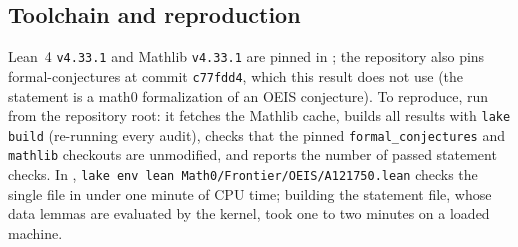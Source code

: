 \documentclass[11pt]{amsart}
\theoremstyle{plain}
\theoremstyle{definition}
\begin{document}
\subsection*{Toolchain and reproduction}
Lean~4 \cite{Lean4} \texttt{v4.33.1} and Mathlib \cite{Mathlib} \texttt{v4.33.1} are pinned in ; the repository also pins formal-conjectures \cite{FC} at commit \texttt{c77fdd4}, which this result does not use (the statement is a math0 formalization of an OEIS conjecture). To reproduce, run  from the repository root: it fetches the Mathlib cache, builds all results with \texttt{lake build} (re-running every audit), checks that the pinned \texttt{formal\_conjectures} and \texttt{mathlib} checkouts are unmodified, and reports the number of passed statement checks. In , \texttt{lake env lean Math0/Frontier/OEIS/A121750.lean} checks the single file in under one minute of CPU time; building the statement file, whose data lemmas are evaluated by the kernel, took one to two minutes on a loaded machine.
\end{document}
